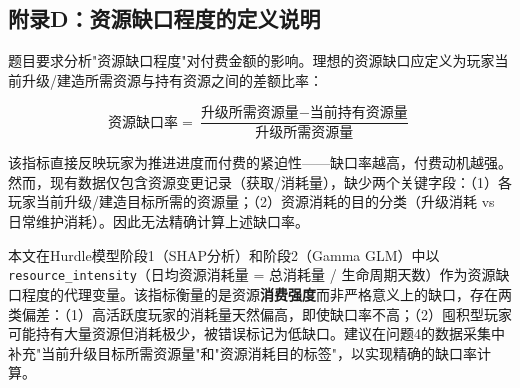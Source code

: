 \subsection{附录D：资源缺口程度的定义说明}

题目要求分析"资源缺口程度"对付费金额的影响。理想的资源缺口应定义为玩家当前升级/建造所需资源与持有资源之间的差额比率：

\begin{equation}
\text{资源缺口率} = \frac{\text{升级所需资源量} - \text{当前持有资源量}}{\text{升级所需资源量}}
\end{equation}

该指标直接反映玩家为推进进度而付费的紧迫性——缺口率越高，付费动机越强。然而，现有数据仅包含资源变更记录（获取/消耗量），缺少两个关键字段：（1）各玩家当前升级/建造目标所需的资源量；（2）资源消耗的目的分类（升级消耗 vs 日常维护消耗）。因此无法精确计算上述缺口率。

本文在Hurdle模型阶段1（SHAP分析）和阶段2（Gamma GLM）中以\texttt{resource\_intensity}（日均资源消耗量 = 总消耗量 / 生命周期天数）作为资源缺口程度的代理变量。该指标衡量的是资源\textbf{消费强度}而非严格意义上的缺口，存在两类偏差：（1）高活跃度玩家的消耗量天然偏高，即使缺口率不高；（2）囤积型玩家可能持有大量资源但消耗极少，被错误标记为低缺口。建议在问题4的数据采集中补充"当前升级目标所需资源量"和"资源消耗目的标签"，以实现精确的缺口率计算。
